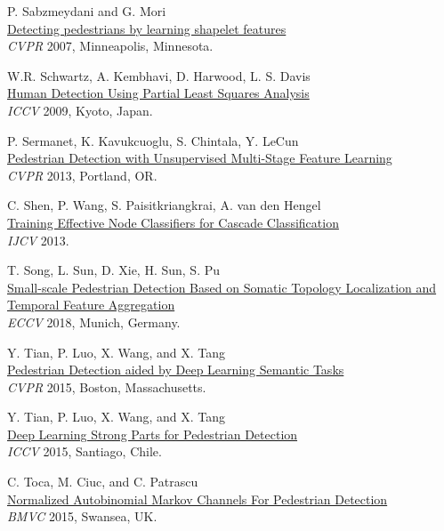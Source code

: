 \documentclass[onecolumn]{article}
\begin{document}
\begin{thebibliography}{1}
P. Sabzmeydani and G. Mori\\
\href{http://www.cs.sfu.ca/~mori/research}{
Detecting pedestrians by learning shapelet features}\\
\textit{CVPR} 2007, Minneapolis, Minnesota.

W.R. Schwartz, A. Kembhavi, D. Harwood, L. S. Davis\\
\href{http://homepages.dcc.ufmg.br/~william/softwares.html\#detectorPLS}{
Human Detection Using Partial Least Squares Analysis}\\
\textit{ICCV} 2009, Kyoto, Japan.

P. Sermanet, K. Kavukcuoglu, S. Chintala, Y. LeCun\\
\href{http://cs.nyu.edu/~sermanet/}{
Pedestrian Detection with Unsupervised Multi-Stage Feature Learning}\\
\textit{CVPR} 2013, Portland, OR.

C. Shen, P. Wang, S. Paisitkriangkrai, A. van den Hengel\\
\href{http://arxiv.org/abs/1301.2032}{
Training Effective Node Classifiers for Cascade Classification}\\
\textit{IJCV} 2013.

T. Song, L. Sun, D. Xie, H. Sun, S. Pu\\
\href{https://arxiv.org/abs/1807.01438}{
Small-scale Pedestrian Detection Based on Somatic Topology Localization and Temporal Feature Aggregation}\\
\textit{ECCV} 2018, Munich, Germany.

Y. Tian, P. Luo, X. Wang, and X. Tang\\
\href{http://mmlab.ie.cuhk.edu.hk/projects/TA-CNN/}{
Pedestrian Detection aided by Deep Learning Semantic Tasks}\\
\textit{CVPR} 2015, Boston, Massachusetts.

Y. Tian, P. Luo, X. Wang, and X. Tang\\
\href{http://personal.ie.cuhk.edu.hk/~ty014/}{
Deep Learning Strong Parts for Pedestrian Detection}\\
\textit{ICCV} 2015, Santiago, Chile.

C. Toca, M. Ciuc, and C. Patrascu\\
\href{http://bmvc2015.swansea.ac.uk/proceedings/papers/paper175/paper175.pdf}{
Normalized Autobinomial Markov Channels For Pedestrian Detection}\\
\textit{BMVC} 2015, Swansea, UK.


\end{thebibliography}
\end{document}
